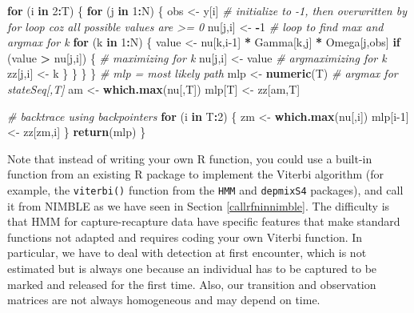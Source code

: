 \documentclass[
  12pt,
]{krantz}
\newenvironment{Shaded}{\begin{snugshade}}{\end{snugshade}}
\newcommand{\CommentTok}[1]{\textcolor[rgb]{0.56,0.35,0.01}{\textit{#1}}}
\newcommand{\ControlFlowTok}[1]{\textcolor[rgb]{0.13,0.29,0.53}{\textbf{#1}}}
\newcommand{\DecValTok}[1]{\textcolor[rgb]{0.00,0.00,0.81}{#1}}
\newcommand{\FunctionTok}[1]{\textcolor[rgb]{0.13,0.29,0.53}{\textbf{#1}}}
\newcommand{\NormalTok}[1]{#1}
\newcommand{\OtherTok}[1]{\textcolor[rgb]{0.56,0.35,0.01}{#1}}
\newcommand{\SpecialCharTok}[1]{\textcolor[rgb]{0.81,0.36,0.00}{\textbf{#1}}}
\begin{document}
\begin{Shaded}
\begin{Highlighting}[]
\ControlFlowTok{for}\NormalTok{ (i }\ControlFlowTok{in} \DecValTok{2}\SpecialCharTok{:}\NormalTok{T) \{}
    \ControlFlowTok{for}\NormalTok{ (j }\ControlFlowTok{in} \DecValTok{1}\SpecialCharTok{:}\NormalTok{N) \{}
\NormalTok{      obs }\OtherTok{\textless{}{-}}\NormalTok{ y[i]}
      \CommentTok{\# initialize to {-}1, then overwritten by for loop coz all possible values are \textgreater{}= 0}
\NormalTok{      nu[j,i] }\OtherTok{\textless{}{-}} \SpecialCharTok{{-}}\DecValTok{1}
      \CommentTok{\# loop to find max and argmax for k}
      \ControlFlowTok{for}\NormalTok{ (k }\ControlFlowTok{in} \DecValTok{1}\SpecialCharTok{:}\NormalTok{N) \{}
\NormalTok{        value }\OtherTok{\textless{}{-}}\NormalTok{ nu[k,i}\DecValTok{{-}1}\NormalTok{] }\SpecialCharTok{*}\NormalTok{ Gamma[k,j] }\SpecialCharTok{*}\NormalTok{ Omega[j,obs]}
        \ControlFlowTok{if}\NormalTok{ (value }\SpecialCharTok{\textgreater{}}\NormalTok{ nu[j,i]) \{}
          \CommentTok{\# maximizing for k}
\NormalTok{          nu[j,i] }\OtherTok{\textless{}{-}}\NormalTok{ value}
          \CommentTok{\# argmaximizing for k}
\NormalTok{          zz[j,i] }\OtherTok{\textless{}{-}}\NormalTok{ k}
\NormalTok{        \}}
\NormalTok{      \}}
\NormalTok{    \}}
\NormalTok{  \}}
  \CommentTok{\# mlp = most likely path}
\NormalTok{  mlp }\OtherTok{\textless{}{-}} \FunctionTok{numeric}\NormalTok{(T)}
  \CommentTok{\# argmax for stateSeq[,T]}
\NormalTok{  am }\OtherTok{\textless{}{-}} \FunctionTok{which.max}\NormalTok{(nu[,T])}
\NormalTok{  mlp[T] }\OtherTok{\textless{}{-}}\NormalTok{ zz[am,T]}
  
  \CommentTok{\# backtrace using backpointers}
  \ControlFlowTok{for}\NormalTok{ (i }\ControlFlowTok{in}\NormalTok{ T}\SpecialCharTok{:}\DecValTok{2}\NormalTok{) \{}
\NormalTok{    zm }\OtherTok{\textless{}{-}} \FunctionTok{which.max}\NormalTok{(nu[,i])}
\NormalTok{    mlp[i}\DecValTok{{-}1}\NormalTok{] }\OtherTok{\textless{}{-}}\NormalTok{ zz[zm,i]}
\NormalTok{  \}}
  \FunctionTok{return}\NormalTok{(mlp)}
\NormalTok{\}}
\end{Highlighting}
\end{Shaded}

Note that instead of writing your own R function, you could use a built-in function from an existing R package to implement the Viterbi algorithm (for example, the \texttt{viterbi()} function from the \texttt{HMM} and \texttt{depmixS4} packages), and call it from NIMBLE as we have seen in Section \ref{callrfninnimble}. The difficulty is that HMM for capture-recapture data have specific features that make standard functions not adapted and requires coding your own Viterbi function. In particular, we have to deal with detection at first encounter, which is not estimated but is always one because an individual has to be captured to be marked and released for the first time. Also, our transition and observation matrices are not always homogeneous and may depend on time.
\end{document}
